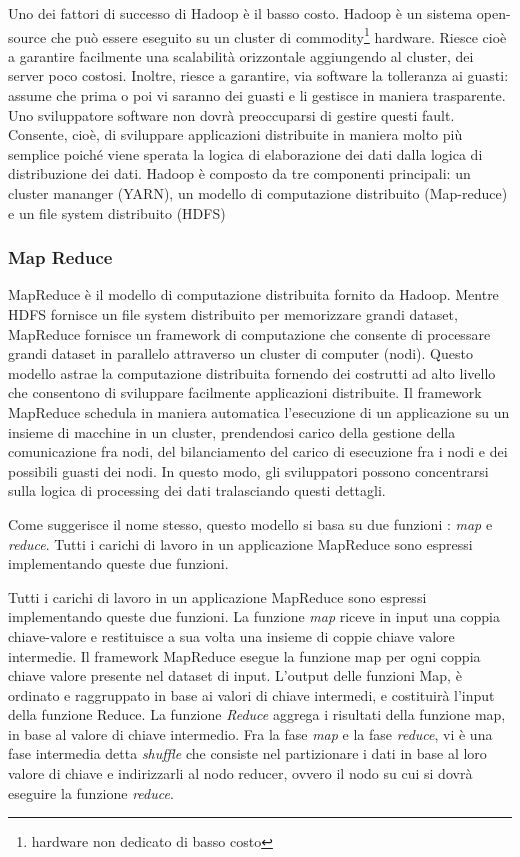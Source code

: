 Uno dei fattori di successo di Hadoop è il basso costo. Hadoop è un sistema open-source che può essere eseguito su un cluster di commodity\footnote{hardware non dedicato di basso costo} hardware. Riesce cioè a garantire facilmente una scalabilità orizzontale aggiungendo al cluster, dei server poco costosi. Inoltre, riesce a garantire, via software la tolleranza ai guasti: assume che prima o poi vi saranno dei guasti e li gestisce in maniera trasparente. Uno sviluppatore software non dovrà preoccuparsi di gestire questi fault. Consente, cioè, di sviluppare applicazioni distribuite in maniera molto più semplice poiché viene sperata la logica di elaborazione dei dati dalla logica di distribuzione dei dati.
Hadoop è composto da tre componenti principali: un cluster mananger (YARN), un modello di computazione distribuito (Map-reduce) e un file system distribuito (HDFS)



 
 \subsubsection{Map Reduce}
 MapReduce \cite{Dean:2004:MSD:1251254.1251264} è il modello di computazione distribuita fornito da Hadoop. Mentre HDFS fornisce un file system distribuito per memorizzare grandi dataset, MapReduce fornisce un framework di computazione che consente di processare grandi dataset in parallelo attraverso un cluster di computer (nodi). Questo modello astrae la computazione distribuita fornendo dei costrutti ad alto livello che consentono di sviluppare facilmente applicazioni distribuite.
 Il framework MapReduce schedula in maniera automatica l'esecuzione di un applicazione su un insieme di macchine in un cluster, prendendosi carico  della gestione della comunicazione fra nodi, del bilanciamento del carico di esecuzione fra i nodi e dei possibili guasti dei nodi.
In questo modo, gli sviluppatori possono concentrarsi sulla logica di processing dei dati tralasciando questi dettagli.



 

Come suggerisce il nome stesso, questo modello si basa su due funzioni : \emph{map} e
\emph{reduce}. Tutti i carichi di lavoro in un applicazione MapReduce sono espressi implementando queste due funzioni. 


Tutti i carichi di lavoro in un applicazione MapReduce sono espressi implementando queste due funzioni.  
La funzione \emph{map} riceve in input una coppia chiave-valore e restituisce a sua volta una insieme di  coppie chiave valore intermedie. Il framework MapReduce esegue la funzione map per ogni coppia chiave valore presente nel dataset di input. L'output delle funzioni Map, è ordinato e raggruppato in base ai valori di chiave intermedi, e costituirà l'input della funzione Reduce. La funzione \emph{Reduce} aggrega i risultati della funzione map, in base al valore di chiave intermedio.
Fra la fase \emph{map} e la fase \emph{reduce}, vi è una fase intermedia detta \emph{shuffle} che consiste nel partizionare i dati in base al loro valore di chiave e indirizzarli al nodo reducer, ovvero il nodo su cui si dovrà eseguire la funzione \emph{reduce}.

